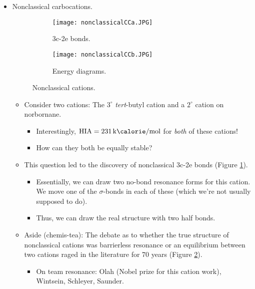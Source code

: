 \documentclass[../notes.tex]{subfiles}
\begin{document}
\begin{itemize}
    \item Nonclassical carbocations.
    \begin{figure}[h!]
        \centering
        \begin{subfigure}[b]{0.49\linewidth}
            \centering
            \texttt{[image: nonclassicalCCa.JPG]}
            \caption{3c-2e bonds.}
            \label{fig:nonclassicalCCa}
        \end{subfigure}
        \begin{subfigure}[b]{0.3\linewidth}
            \centering
            \texttt{[image: nonclassicalCCb.JPG]}
            \caption{Energy diagrams.}
            \label{fig:nonclassicalCCb}
        \end{subfigure}
        \caption{Nonclassical cations.}
        \label{fig:nonclassicalCC}
    \end{figure}
    \begin{itemize}
        \item Consider two cations: The $3^\circ$ \emph{tert}-butyl cation and a $2^\circ$ cation on norbornane.
        \begin{itemize}
            \item Interestingly, $\text{HIA}=\SI[per-mode=symbol]{231}{\kilo\calorie\per\mole}$ for \emph{both} of these cations!
            \item How can they both be equally stable?
        \end{itemize}
        \item This question led to the discovery of nonclassical 3c-2e bonds (Figure \ref{fig:nonclassicalCCa}).
        \begin{itemize}
            \item Essentially, we can draw two no-bond resonance forms for this cation. We move one of the $\sigma$-bonds in each of these (which we're not usually supposed to do).
            \item Thus, we can draw the real structure with two half bonds.
        \end{itemize}
        \pagebreak
        \item Aside (chemis-tea): The debate as to whether the true structure of nonclassical cations was barrierless resonance or an equilibrium between two cations raged in the literature for 70 years (Figure \ref{fig:nonclassicalCCb}).
        \begin{itemize}
            \item On team resonance: Olah (Nobel prize for this cation work), Wintsein, Schleyer, Saunder.

\end{itemize}
\end{itemize}
\end{itemize}
\end{document}
